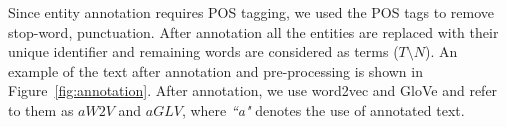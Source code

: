 Since entity annotation requires POS tagging, we used the POS tags to remove stop-word, punctuation. After annotation all the entities are replaced with their unique identifier and remaining words are considered as terms ($T\setminus  N$). An example of the text after annotation and pre-processing is shown in Figure~\ref{fig:annotation}. After annotation, we use word2vec and GloVe and refer to them as $aW2V$ and $aGLV$, where \emph{``a"} denotes the use of annotated text. 
%

